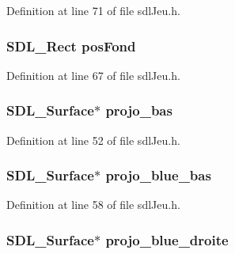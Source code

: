Definition at line 71 of file sdl\-Jeu.\-h.

\hypertarget{structsdl_jeu_a1bb4e9da2e503d2e0c61d362a5e13234}{
\subsubsection[{pos\-Fond}]{\setlength{\rightskip}{0pt plus 5cm}S\-D\-L\-\_\-\-Rect pos\-Fond}}\label{structsdl_jeu_a1bb4e9da2e503d2e0c61d362a5e13234}


Definition at line 67 of file sdl\-Jeu.\-h.

\hypertarget{structsdl_jeu_a057caebe9a2bda0166b2767d19d84318}{
\subsubsection[{projo\-\_\-bas}]{\setlength{\rightskip}{0pt plus 5cm}S\-D\-L\-\_\-\-Surface$\ast$ projo\-\_\-bas}}\label{structsdl_jeu_a057caebe9a2bda0166b2767d19d84318}


Definition at line 52 of file sdl\-Jeu.\-h.

\hypertarget{structsdl_jeu_a8798b282fc596b5711ba522d95ffb041}{
\subsubsection[{projo\-\_\-blue\-\_\-bas}]{\setlength{\rightskip}{0pt plus 5cm}S\-D\-L\-\_\-\-Surface$\ast$ projo\-\_\-blue\-\_\-bas}}\label{structsdl_jeu_a8798b282fc596b5711ba522d95ffb041}


Definition at line 58 of file sdl\-Jeu.\-h.

\hypertarget{structsdl_jeu_af18510332136243335ab74b8f6876e1d}{
\subsubsection[{projo\-\_\-blue\-\_\-droite}]{\setlength{\rightskip}{0pt plus 5cm}S\-D\-L\-\_\-\-Surface$\ast$ projo\-\_\-blue\-\_\-droite}}\label{structsdl_jeu_af18510332136243335ab74b8f6876e1d}


